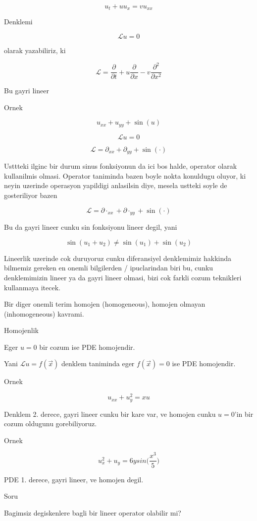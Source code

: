 \documentclass[12pt,fleqn]{article}\usepackage{../common}
\begin{document}
\[ u_t + u u_x = v u_{xx} \]

Denklemi 

\[ \mathcal{L}u = 0 \]

olarak yazabiliriz, ki 

\[ \mathcal{L} = \frac{\partial }{\partial t} + 
u \frac{\partial }{\partial x} - v\frac{\partial ^2}{\partial x^2}
\]

Bu gayri lineer

Ornek

\[ u_{xx} + u_{yy} + \sin(u) \]

\[ \mathcal{L} u = 0 \]

\[ \mathcal{L} = \partial_{xx} + \partial_{yy} + \sin(\cdot) \]

Usttteki ilginc bir durum sinus fonksiyonun da ici bos halde, operator
olarak kullanilmis olmasi. Operator taniminda bazen boyle nokta konuldugu
oluyor, ki neyin uzerinde operasyon yapildigi anlasilsin diye, mesela
ustteki soyle de gosteriliyor bazen

\[ \mathcal{L} = \partial\cdot_{xx} + \partial\cdot_{yy} + \sin(\cdot) \]

Bu da gayri lineer cunku sin fonksiyonu lineer degil, yani

\[ \sin(u_1 + u_2) \ne \sin(u_1) + \sin(u_2) \]

Lineerlik uzerinde cok duruyoruz cunku diferansiyel denklemimiz hakkinda
bilmemiz gereken en onemli bilgilerden / ipuclarindan biri bu, cunku
denklemimizin lineer ya da gayri lineer olmasi, bizi cok farkli cozum
teknikleri kullanmaya itecek.

Bir diger onemli terim homojen (homogeneous), homojen olmayan
(inhomogeneous) kavrami. 

Homojenlik

Eger $u=0$ bir cozum ise PDE homojendir. 

Yani $\mathcal{L} u = f(\vec{x})$ denklem taniminda eger $f(\vec{x})=0$ ise PDE homojendir. 

Ornek

\[ u_{xx} + u_y^2 = xu \]

Denklem 2. derece, gayri lineer cunku bir kare var, ve homojen cunku
$u=0$'in bir cozum oldugunu gorebiliyoruz. 

Ornek

\[ u_x^2 + u_y = 6y sin\bigg(\frac{x^3}{5}\bigg) \]

PDE 1. derece, gayri lineer, ve homojen degil. 

Soru

Bagimsiz degiskenlere bagli bir lineer operator olabilir mi? 
\end{document}
